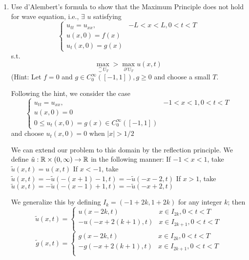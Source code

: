 \begin{enumerate}
\item
  Use d'Alembert's formula to show that the Maximum Principle does not hold for wave equation, i.e., $\exists$ $u$ satisfying
  $$
  \begin{cases}
    u_{tt} = u_{xx}, & -L < x < L, 0 < t < T\\
    u(x, 0) = f(x)\\
    u_t(x, 0) = g(x)
  \end{cases}
  $$
  s.t.
  $$
  \max \limits_{\closure{U}_T} > \max \limits_{\partial' U_T} u(x, t)
  $$
  (Hint: Let $f = 0$ and $g \in C_0^\infty([-1, 1]), g \geq 0$ and choose a small $T$.

  Following the hint, we consider the case
  $$
  \begin{cases}
    u_{tt} = u_{xx}, & -1 < x < 1, 0 < t < T\\
    u(x, 0) = 0\\
    0 \leq u_t(x, 0) = g(x) \in C_0^\infty([-1, 1]) 
  \end{cases}
  $$
  and choose $u_t(x, 0) = 0$ when $|x| > 1/2$

  We can extend our problem to this domain by the reflection principle.
  We define $\tilde{u}: \mathbb{R} \times (0, \infty) \rightarrow \mathbb{R}$ in the following manner:
  If $-1 < x < 1$, take $\tilde{u}(x, t) = u(x, t)$
  If $x < -1$, take $\tilde{u}(x, t) = -\tilde{u}(-(x + 1) - 1, t) = -\tilde{u}(-x - 2, t)$
  If $x > 1$, take $\tilde{u}(x, t) = -\tilde{u}(-(x - 1) + 1, t) = -\tilde{u}(-x + 2, t)$

  We generalize this by defining $I_k = (-1 + 2 k, 1 + 2 k)$ for any integer $k$;
  then
  $$
  \tilde{u}(x, t) =
  \begin{cases}
    u(x - 2 k, t) & x \in I_{2 k}, 0 < t < T\\
    -u(-x + 2 (k + 1), t) & x \in I_{2 k + 1}, 0 < t < T\\
  \end{cases}
  $$
  $$
  \tilde{g}(x, t) =
  \begin{cases}
    g(x - 2 k, t) & x \in I_{2 k}, 0 < t < T\\
    -g(-x + 2 (k + 1), t) & x \in I_{2 k + 1}, 0 < t < T\\
  \end{cases}
  $$


\end{enumerate}
